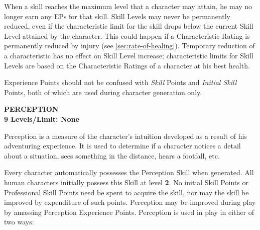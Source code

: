 When a skill reaches the maximum level that a character may attain, he
may no longer earn any EPs for that skill.  Skill Levels may never be
permanently reduced, even if the characteristic limit for the skill
drops below the current Skill Level attained by the character.  This
could happen if a Characteristic Rating is permanently reduced by
injury (see \ref{sec:rate-of-healing}).  Temporary reduction of a
characteristic has no effect on Skill Level increase; characteristic
limits for Skill Levels are based on the Characteristic Ratings of a
character at his best health.

Experience Points should not be confused with \emph{Skill} Points and
\emph{Initial Skill} Points, both of which are used during character
generation only.



\bigskip

\newcommand{\skill}[2]{%

\bigskip

\noindent\textbf{\sffamily\large\MakeUppercase{#1}}\\
\textbf{#2}\index{#1}}

\skill{perception}{9 Levels/Limit: None}\label{sec:skill-perception}

Perception is a measure of the character's intuition developed as a
result of his adventuring experience.  It is used to determine if a
character notices a detail about a situation, sees something in the
distance, hears a footfall, etc.

Every character automatically possesses the Perception Skill when
generated.  All human characters initially possess this Skill at level
\textbf{2}.  No initial Skill Points or Professional Skill Points need
be spent to acquire the skill, nor may the skill be improved by
expenditure of such points.  Perception may be improved during play by
amassing Perception Experience Points.  Perception is used in play in
either of two ways:

